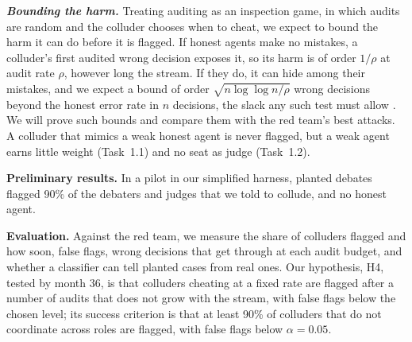 \documentclass[12pt,letterpaper]{article}
\newcommand{\hd}[1]{\ifhmode\par\fi\addvspace{1pt}\noindent\textbf{#1}\hspace{0.35em}}
\newcommand{\slab}[1]{\textbf{\textit{#1}}}
\begin{document}
\slab{Bounding the harm.} Treating auditing as an inspection game, in which audits are random and the colluder chooses when to cheat, we expect to bound the harm it can do before it is flagged. If honest agents make no mistakes, a colluder's first audited wrong decision exposes it, so its harm is of order $1/\rho$ at audit rate $\rho$, however long the stream. If they do, it can hide among their mistakes, and we expect a bound of order $\sqrt{n\log\log n/\rho}$ wrong decisions beyond the honest error rate in $n$ decisions, the slack any such test must allow \citep{howard2021timeuniform}. We will prove such bounds and compare them with the red team's best attacks. A colluder that mimics a weak honest agent is never flagged, but a weak agent earns little weight (Task~1.1) and no seat as judge (Task~1.2).
\hd{Preliminary results.} In a pilot in our simplified harness, planted debates flagged 90\% of the debaters and judges that we told to collude, and no honest agent.

\hd{Evaluation.} Against the red team, we measure the share of colluders flagged and how soon, false flags, wrong decisions that get through at each audit budget, and whether a classifier can tell planted cases from real ones. Our hypothesis, H4, tested by month 36, is that colluders cheating at a fixed rate are flagged after a number of audits that does not grow with the stream, with false flags below the chosen level; its success criterion is that at least 90\% of colluders that do not coordinate across roles are flagged, with false flags below $\alpha=0.05$.
\end{document}
